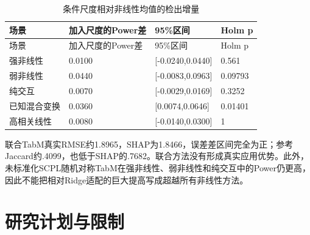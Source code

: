 \documentclass[UTF8,11pt,a4paper]{ctexart}
\begin{document}
{
\footnotesize
\begin{longtable}[]{@{}llll@{}}
\caption{条件尺度相对非线性均值的检出增量}\tabularnewline
\toprule\noalign{}
场景 & 加入尺度的Power差 & 95\%区间 & Holm p \\
\midrule\noalign{}
\endfirsthead
\toprule\noalign{}
场景 & 加入尺度的Power差 & 95\%区间 & Holm p \\
\midrule\noalign{}
\endhead
\bottomrule\noalign{}
\endlastfoot
强非线性 & 0.0100 & {[}-0.0240,0.0440{]} & 0.561 \\
弱非线性 & 0.0440 & {[}-0.0083,0.0963{]} & 0.09793 \\
纯交互 & 0.0070 & {[}-0.0029,0.0169{]} & 0.3252 \\
已知混合变换 & 0.0360 & {[}0.0074,0.0646{]} & 0.01401 \\
高相关线性 & 0.0080 & {[}-0.0140,0.0300{]} & 1 \\
\end{longtable}
}

联合TabM真实RMSE约1.8965，SHAP为1.8466，误差差区间完全为正；参考Jaccard约.4099，也低于SHAP的.7682。联合方法没有形成真实应用优势。此外，未标准化SCPL随机对称TabM在强非线性、弱非线性和纯交互中的Power仍更高，因此不能把相对Ridge适配的巨大提高写成超越所有非线性方法。

\section{研究计划与限制}
\end{document}
